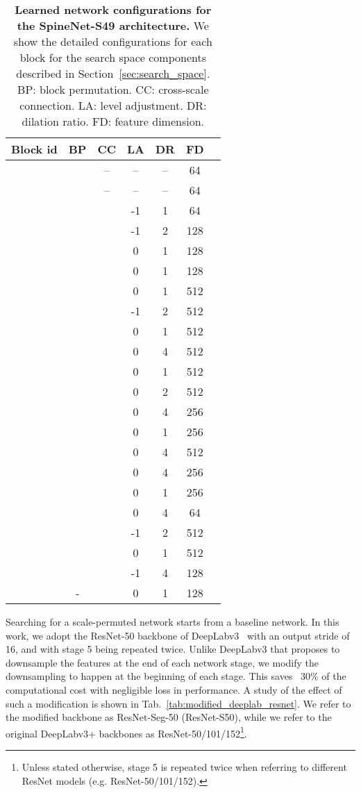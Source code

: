 \documentclass[10pt,twocolumn,letterpaper]{article}
\begin{document}
\setlength{\tabcolsep}{4pt}
\begin{table}[t!]
\centering
\begin{tabular}{c  |cccccc}
  \toprule
  Block id & BP & CC & LA & DR & FD \\
  \midrule
   &  & -- &-- & -- & 64 \\ 
   &  & -- & -- & -- & 64 \\
  \midrule
   &  &  & -1 & 1 & 64\\
   &  &  & -1 & 2 & 128\\
   &  &  & 0 & 1 & 128\\
   &  &  & 0 & 1 & 128\\
   &  &  & 0 & 1 & 512\\
   &  &  & -1 & 2 & 512\\
   &  &  & 0 & 1 & 512\\
   &  &  & 0 & 4 & 512\\
   &  &  & 0 & 1 & 512\\
   &  &  & 0 & 2 & 512\\
   &  &  & 0 & 4 & 256\\
   &  &  & 0 & 1 & 256\\
   &  &  & 0 & 4 & 512 \\
   &  &  & 0 & 4 & 256\\
   &  &  & 0 & 1 & 256\\
   &  &  & 0 & 4 & 64 \\
   &  &  & -1 & 2 & 512\\
   &  &  & 0 & 1 & 512\\
   &  &  & -1 & 4 & 128\\
  \midrule
   & - &  & 0 & 1 & 128\\
  \bottomrule
\end{tabular}
\caption{\textbf{Learned network configurations for the SpineNet-S49 architecture.} We show the detailed configurations for each block for the search space components described in Section~\ref{sec:search_space}. BP: block permutation. CC: cross-scale connection. LA: level adjustment. DR: dilation ratio. FD: feature dimension.}
\label{tab:search_results} 
\end{table}


Searching for a scale-permuted network starts from a baseline network. In this work, we adopt the ResNet-50 backbone of DeepLabv3~\cite{deeplabv3} with an output stride of 16, and with stage 5 being repeated twice. Unlike DeepLabv3 that proposes to downsample the features at the end of each network stage, we modify the downsampling to happen at the beginning of each stage. This saves ~30\% of the computational cost with negligible loss in performance. A study of the effect of such a modification is shown in Tab.~\ref{tab:modified_deeplab_resnet}. We refer to the modified backbone as ResNet-Seg-50 (ResNet-S50), while we refer to the original DeepLabv3+ backbones as ResNet-50/101/152\footnote{Unless stated otherwise, stage 5 is repeated twice when referring to different ResNet models (e.g. ResNet-50/101/152).}.
\end{document}
